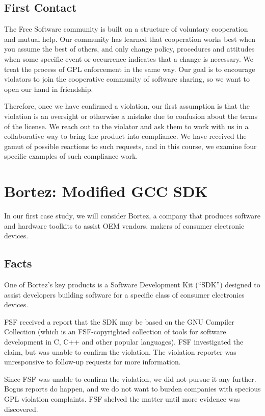 {\section{First Contact}

The Free Software community is built on a structure of voluntary
cooperation and mutual help. Our community has learned that cooperation
works best when you assume the best of others, and only change policy,
procedures and attitudes when some specific event or occurrence indicates
that a change is necessary. We treat the process of GPL enforcement in
the same way. Our goal is to encourage violators to join the cooperative
community of software sharing, so we want to open our hand in friendship.

Therefore, once we have confirmed a violation, our first assumption is
that the violation is an oversight or otherwise a mistake due to confusion
about the terms of the license. We reach out to the violator and ask them
to work with us in a collaborative way to bring the product into
compliance. We have received the gamut of possible reactions to such
requests, and in this course, we examine four specific examples of such
compliance work.


\chapter{Bortez: Modified GCC SDK}

In our first case study, we will consider Bortez, a company that
produces software and hardware toolkits to assist OEM vendors, makers
of consumer electronic devices.

\section{Facts}

One of Bortez's key products is a Software Development Kit (``SDK'')
designed to assist developers building software for a specific class of
consumer electronics devices.

FSF received a report that the SDK may be based on the GNU Compiler
Collection (which is an FSF-copyrighted collection of tools for software
development in C, C++ and other popular languages). FSF investigated the
claim, but was unable to confirm the violation. The violation reporter
was unresponsive to follow-up requests for more information.

Since FSF was unable to confirm the violation, we did not pursue it any
further. Bogus reports do happen, and we do not want to burden companies
with specious GPL violation complaints. FSF shelved the matter until
more evidence was discovered.

}
